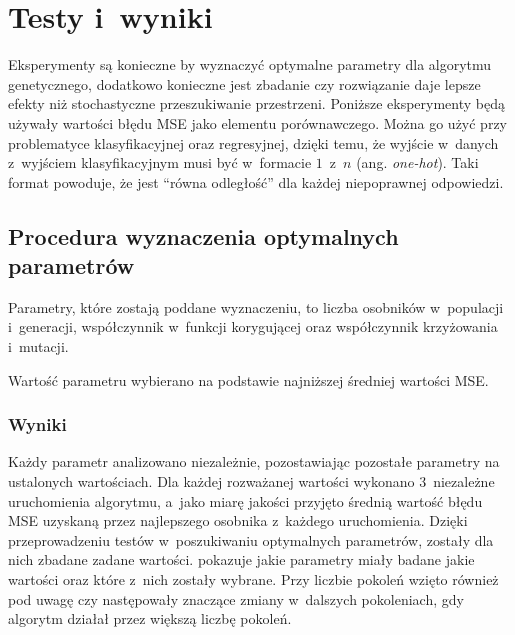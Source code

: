 \chapter{Testy i~wyniki}
\label{chap:test_and_result}
Eksperymenty są konieczne by wyznaczyć
optymalne parametry dla algorytmu genetycznego,
dodatkowo konieczne jest zbadanie czy rozwiązanie daje
lepsze efekty niż stochastyczne przeszukiwanie przestrzeni.
Poniższe eksperymenty będą używały wartości
błędu \gls{MSE} jako elementu porównawczego.
Można go użyć przy problematyce
klasyfikacyjnej oraz regresyjnej, dzięki temu,
że wyjście w~danych z~wyjściem klasyfikacyjnym musi
być w~formacie $1$~z~$n$ (ang. \textit{one-hot}).
Taki format powoduje, że jest ``równa odległość''
dla każdej niepoprawnej odpowiedzi.

\section{Procedura wyznaczenia optymalnych parametrów}
Parametry, które zostają poddane wyznaczeniu,
to liczba osobników w~populacji i~generacji,
współczynnik w~funkcji korygującej
oraz współczynnik krzyżowania i~mutacji.

Wartość parametru wybierano na podstawie
najniższej średniej wartości \gls{MSE}.

\tocless\subsection{Wyniki}
Każdy parametr analizowano niezależnie,
pozostawiając pozostałe parametry na ustalonych wartościach.
Dla każdej rozważanej wartości wykonano
$3$~niezależne uruchomienia algorytmu,
a~jako miarę jakości przyjęto średnią wartość
błędu \gls{MSE} uzyskaną przez najlepszego
osobnika z~każdego uruchomienia.
Dzięki przeprowadzeniu testów
w~poszukiwaniu optymalnych parametrów,
zostały dla nich zbadane zadane wartości.
 pokazuje jakie parametry miały
badane jakie wartości oraz które z~nich zostały wybrane.
Przy liczbie pokoleń wzięto również pod uwagę czy
następowały znaczące zmiany w~dalszych pokoleniach,
gdy algorytm działał przez większą liczbę pokoleń.
\begin{table}
  \centering
  
  \caption{
    Parametry wyznaczone pod względem
    optymalnych wartości algorytmu genetycznego.
    Liczba osobników jest parametrem
    określającym wielkość populacji,
    a~liczba pokoleń określa ile zostanie
    ich stworzonych poza inicjalizacyjną,
    czyli ile nastąpi pełnych przejść
    widocznych na \cref{fig:genetic_flow}.
    Parametr $\alpha$ jest współczynnikiem
    występującym w~funkcji korygującej przystosowania
    i~odpowiada za określenie istotności rozmiaru
    sieci w~znajdywaniu optymalnego rozwiązania.
    Współczynniki krzyżowania i~mutacji
    odpowiadają kolejno $p_k$ i~$p_m$.
    Wskazują one na prawdopodobieństwo zajścia
    odpowiednio krzyżowania dla danej pary
    osobników oraz mutacji dla danego osobnika.
  }
  \label{tab:parameter_opt}
\end{table}

